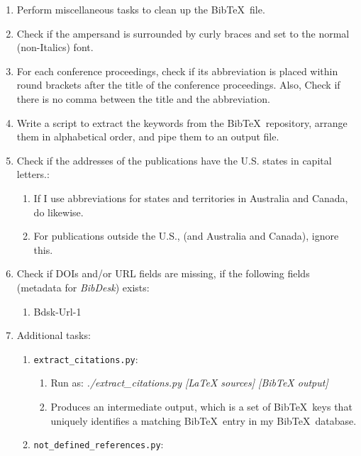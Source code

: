 \begin{enumerate}
\begin{enumerate}
	\end{enumerate}
\item Perform miscellaneous tasks to clean up the {\sc Bib}\TeX\ file.
\item Check if the ampersand is surrounded by curly braces and set to the normal (non-Italics) font.
\item For each conference proceedings, check if its abbreviation is placed within round brackets after the title of the conference proceedings. Also, Check if there is no comma between the title and the abbreviation.
\item Write a script to extract the keywords from the {\sc Bib}\TeX\ repository, arrange them in alphabetical order, and pipe them to an output file.
\item Check if the addresses of the publications have the U.S. states in capital letters.: \vspace{-0.3cm}
	\begin{enumerate} \itemsep -2pt
	\item If I use abbreviations for states and territories in Australia and Canada, do likewise.
	\item For publications outside the U.S., (and Australia and Canada), ignore this.
	\end{enumerate}
\item Check if DOIs and/or URL fields are missing, if the following fields (metadata for {\it BibDesk}) exists: \vspace{-0.3cm}
	\begin{enumerate} \itemsep -2pt
	\item Bdsk-Url-1
	\end{enumerate}
\item Additional tasks: \vspace{-0.3cm}
	\begin{enumerate} \itemsep -2pt
	\item {\tt extract\_citations.py}: \vspace{-0.2cm}
		\begin{enumerate} \itemsep -2pt
		\item Run as: {\it ./extract\_citations.py [LaTeX sources] [BibTeX output]}
		\item Produces an intermediate output, which is a set of {\sc Bib}\TeX\ keys that uniquely identifies a matching {\sc Bib}\TeX\ entry in my {\sc Bib}\TeX\ database.
		\end{enumerate}
	\item {\tt not\_defined\_references.py}: \vspace{-0.2cm}

\end{enumerate}
\end{enumerate}
